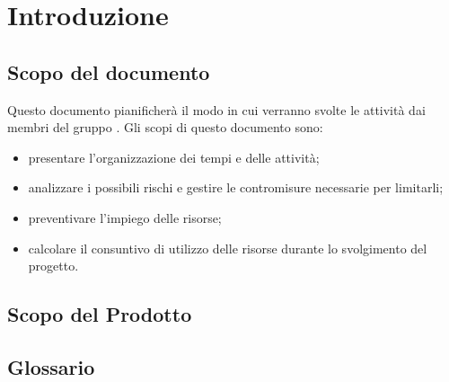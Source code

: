 %


\section{Introduzione}
	\subsection{Scopo del documento}
	Questo documento pianificherà il modo in cui verranno svolte le attività dai membri del gruppo \groupName.
	Gli scopi di questo documento sono:
		\begin{itemize}
			\item presentare l’organizzazione dei tempi e delle attività;
			\item analizzare i possibili rischi e gestire le contromisure necessarie per limitarli;
			\item preventivare l’impiego delle risorse;
			\item calcolare il consuntivo di utilizzo delle risorse durante lo svolgimento del progetto.
		\end{itemize}
		
	\subsection{Scopo del Prodotto}
		\productScope
		
	\subsection{Glossario}
		\glossarioDesc
		

